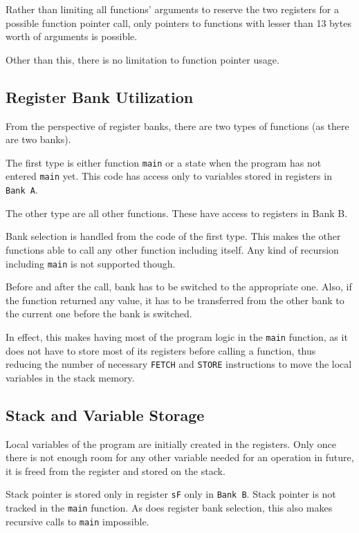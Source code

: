         Rather than limiting all functions' arguments to reserve the two registers for a possible function pointer call, only pointers to functions with lesser than 13 bytes worth of arguments is possible.

        Other than this, there is no limitation to function pointer usage.

        \subsection{Register Bank Utilization}

        From the perspective of register banks, there are two types of functions (as there are two banks). 

        The first type is either function \texttt{main} or a state when the program has not entered \texttt{main} yet. This code has access only to variables stored in registers in \texttt{Bank A}.

        The other type are all other functions. These have access to registers in Bank B.

        Bank selection is handled from the code of the first type. This makes the other functions able to call any other function including itself. Any kind of recursion including \texttt{main} is not supported though.

        Before and after the call, bank has to be switched to the appropriate one. Also, if the function returned any value, it has to be transferred from the other bank to the current one before the bank is switched.

        In effect, this makes having most of the program logic in the \texttt{main} function, as it does not have to store most of its registers before calling a function, thus reducing the number of necessary \texttt{FETCH} and \texttt{STORE} instructions to move the local variables in the stack memory.

        \subsection{Stack and Variable Storage}

        Local variables of the program are initially created in the registers. Only once there is not enough room for any other variable needed for an operation in future, it is freed from the register and stored on the stack.

        Stack pointer is stored only in register \texttt{sF} only in \texttt{Bank B}. Stack pointer is not tracked in the \texttt{main} function. As does register bank selection, this also makes recursive calls to \texttt{main} impossible.

